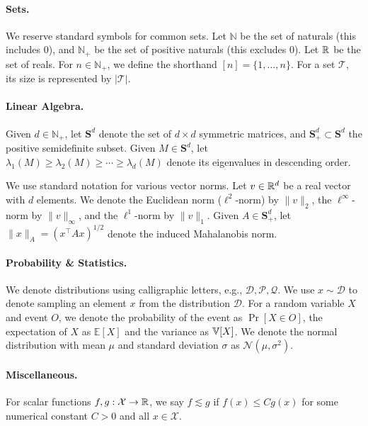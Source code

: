 \paragraph{Sets.} 
We reserve standard symbols for common sets.
Let $\mathbb{N}$ be the set of naturals (this includes 0), and $\mathbb{N}_+$ be the set of positive naturals (this excludes 0).
Let $\mathbb{R}$ be the set of reals.
For $n \in \mathbb{N}_+$, we define the shorthand $[n] = \{1, . . . , n\}$.
For a set $\mathcal{T}$, its size is represented by $|\mathcal{T}|$.

\paragraph{Linear Algebra.}
Given $d \in \mathbb{N}_+$, 
let $\mathbf{S}^d$ denote the set of $d \times d$ symmetric matrices, and $\mathbf{S}^d_+ \subset \mathbf{S}^d$ the positive semidefinite subset. 
Given $M \in \mathbf{S}^d$, let $\lambda_1(M) \ge \lambda_2(M) \ge \cdots \ge \lambda_d(M)$ denote its eigenvalues in descending order.

We use standard notation for various vector norms.
Let $v\in \mathbb{R}^d$ be a real vector with $d$ elements. 
We denote the Euclidean norm ($\ell^2$-norm) by $\|v\|_2$, 
the $\ell^\infty$-norm by $\|v\|_\infty$, and the $\ell^1$-norm by $\|v\|_1$.
Given $A \in \mathbf{S}^d_+$, let $\| x \|_A = (x^\top A x)^{1/2}$ denote the induced Mahalanobis norm.

\paragraph{Probability \& Statistics.}
We denote distributions using calligraphic letters, e.g., $\mathcal{D}, \mathcal{P}, \mathcal{Q}$. We use $x \sim \mathcal{D}$ to denote sampling an element $x$ from the distribution $\mathcal{D}$. For a random variable $X$ and event $O$, we denote the probability of the event as $\operatorname{Pr}[X\in O]$, the expectation of $X$ as $\mathbb{E}[X]$ and the variance as $\mathbb{V}[X]$. We denote the normal distribution with mean $\mu$ and standard deviation $\sigma$ as $\mathcal{N}\left(\mu, \sigma^2\right)$.

\paragraph{Miscellaneous.}
For scalar functions $f,g: \mathcal{X} \to \mathbb{R}$, we say $f \lesssim g$ if $f(x) \leq C g(x)$ for some numerical constant $C>0$ and all $x\in\mathcal{X}$. 
